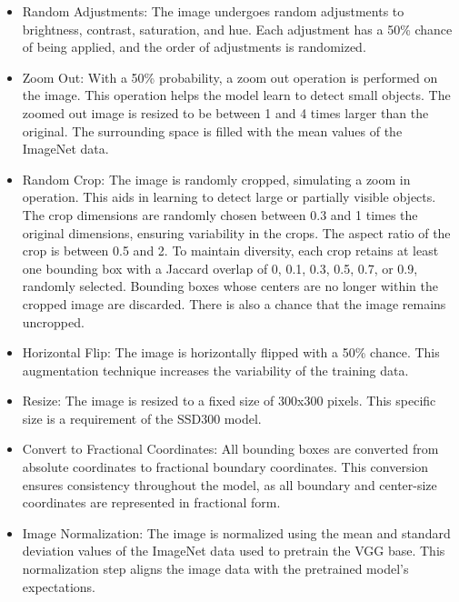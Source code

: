 \documentclass[a4paper]{article}
\begin{document}
\begin{itemize}
	\item Random Adjustments: The image undergoes random adjustments to brightness, contrast, saturation, and hue. Each adjustment has a 50\% chance of being applied, and the order of adjustments is randomized.

	\item Zoom Out: With a 50\% probability, a zoom out operation is performed on the image. This operation helps the model learn to detect small objects. The zoomed out image is resized to be between 1 and 4 times larger than the original. The surrounding space is filled with the mean values of the ImageNet data.

	\item Random Crop: The image is randomly cropped, simulating a zoom in operation. This aids in learning to detect large or partially visible objects. The crop dimensions are randomly chosen between 0.3 and 1 times the original dimensions, ensuring variability in the crops. The aspect ratio of the crop is between 0.5 and 2. To maintain diversity, each crop retains at least one bounding box with a Jaccard overlap of 0, 0.1, 0.3, 0.5, 0.7, or 0.9, randomly selected. Bounding boxes whose centers are no longer within the cropped image are discarded. There is also a chance that the image remains uncropped.

	\item Horizontal Flip: The image is horizontally flipped with a 50\% chance. This augmentation technique increases the variability of the training data.

	\item Resize: The image is resized to a fixed size of 300x300 pixels. This specific size is a requirement of the SSD300 model.

	\item Convert to Fractional Coordinates: All bounding boxes are converted from absolute coordinates to fractional boundary coordinates. This conversion ensures consistency throughout the model, as all boundary and center-size coordinates are represented in fractional form.

	\item Image Normalization: The image is normalized using the mean and standard deviation values of the ImageNet data used to pretrain the VGG base. This normalization step aligns the image data with the pretrained model's expectations.
\end{itemize}
\end{document}
